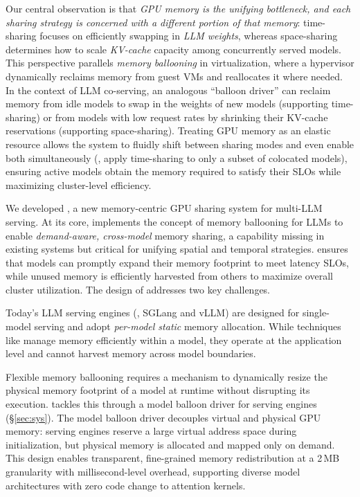 Our central observation is that \emph{GPU memory is the unifying bottleneck, and each sharing strategy is concerned with a different portion of that memory}: time-sharing focuses on efficiently swapping in \emph{LLM weights}, whereas space-sharing determines how to scale \emph{KV-cache} capacity among concurrently served models. This perspective parallels \emph{memory ballooning} in virtualization, where a hypervisor dynamically reclaims memory from guest VMs and reallocates it where needed. In the context of LLM co-serving, an analogous “balloon driver” can reclaim memory from idle models to swap in the weights of new models (supporting time-sharing) or from models with low request rates by shrinking their KV-cache reservations (supporting space-sharing). Treating GPU memory as an elastic resource allows the system to fluidly shift between sharing modes and even enable both simultaneously (\ie, apply time-sharing to only a subset of colocated models), ensuring active models obtain the memory required to satisfy their SLOs while maximizing cluster-level efficiency.

 We developed \tool, a new memory-centric GPU sharing system for multi-LLM serving. At its core, \tool implements the concept of memory ballooning for LLMs to enable \emph{demand-aware, cross-model} memory sharing, a capability missing in existing systems but critical for unifying spatial and temporal strategies. \tool ensures that models can promptly expand their memory footprint to meet latency SLOs, while unused memory is efficiently harvested from others to maximize overall cluster utilization. The design of \tool addresses two key challenges.

 Today's LLM serving engines (\eg, SGLang and vLLM) are designed for single-model serving and adopt \emph{per-model static} memory allocation. While techniques like  manage memory efficiently within a model, they operate at the application level and cannot harvest memory across model boundaries.

Flexible memory ballooning requires a mechanism to dynamically resize the physical memory footprint of a model at runtime without disrupting its execution. \tool tackles this through a model balloon driver for serving engines (\S\ref{sec:sys}). 
The model balloon driver decouples virtual and physical GPU memory: serving engines reserve a large virtual address space during initialization, but physical memory is allocated and mapped only on demand. This design enables transparent, fine-grained memory redistribution at a 2\,MB granularity with millisecond-level overhead,
supporting diverse model architectures with zero code change to attention kernels.

